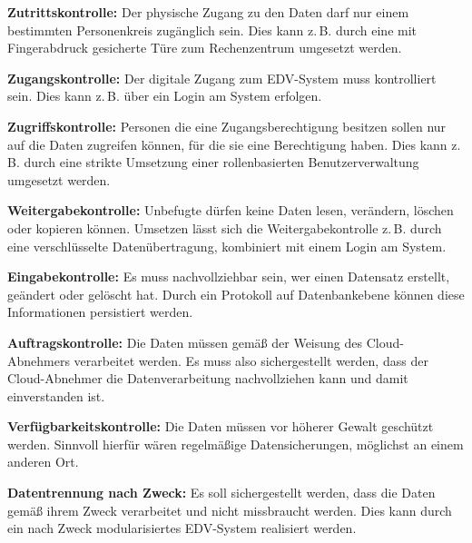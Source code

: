  \begin{seList}                            

\item \textbf{Zutrittskontrolle:}\newline
Der physische Zugang zu den Daten darf nur einem bestimmten Personenkreis zug\"anglich sein. Dies kann z.\,B. durch eine mit Fingerabdruck gesicherte T\"ure zum Rechenzentrum umgesetzt werden.
\item \textbf{Zugangskontrolle:}\newline
Der digitale Zugang zum EDV-System muss kontrolliert sein. Dies kann z.\,B. \"uber ein Login am System erfolgen.
\item \textbf{Zugriffskontrolle:}\newline
Personen die eine Zugangsberechtigung besitzen sollen nur auf die Daten zugreifen k\"onnen, f\"ur die sie eine Berechtigung haben. Dies kann z.\,B. durch eine strikte Umsetzung einer rollenbasierten Benutzerverwaltung umgesetzt werden.  
\item \textbf{Weitergabekontrolle:}\newline
Unbefugte d\"urfen keine Daten lesen, ver\"andern, l\"oschen oder kopieren k\"onnen. Umsetzen l\"asst sich die Weitergabekontrolle z.\,B. durch eine verschl\"usselte Daten\"ubertragung, kombiniert mit einem Login am System.
\item \textbf{Eingabekontrolle:}\newline
Es muss nachvollziehbar sein, wer einen Datensatz erstellt, ge\"andert oder gel\"oscht hat. Durch ein Protokoll auf Datenbankebene k\"onnen diese Informationen persistiert werden. 
\item \textbf{Auftragskontrolle:}\newline
Die Daten m\"ussen gem\"a{\ss} der Weisung des Cloud-Abnehmers verarbeitet werden. Es muss also sichergestellt werden, dass der Cloud-Abnehmer die Datenverarbeitung nachvollziehen kann und damit einverstanden ist.
\item \textbf{Verf\"ugbarkeitskontrolle:}\newline
Die Daten m\"ussen vor h\"oherer Gewalt gesch\"utzt werden. Sinnvoll hierf\"ur w\"aren regelm\"a{\ss}ige Datensicherungen, m\"oglichst an einem anderen Ort.
\item \textbf{Datentrennung nach Zweck:}\newline
Es soll sichergestellt werden, dass die Daten gem\"a{\ss} ihrem Zweck verarbeitet und nicht missbraucht werden. Dies kann durch ein nach Zweck modularisiertes  EDV-System realisiert werden.
\end{seList}

